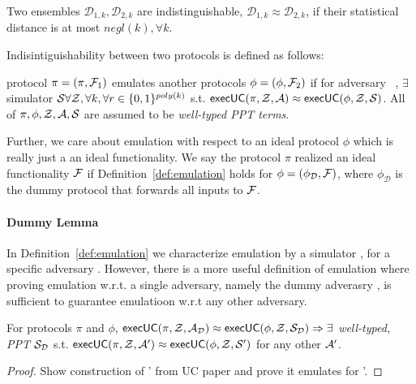 \begin{definition}[Indisinguishability]\label{def:distance}
Two ensembles $\mathcal{D}_{1,k}, \mathcal{D}_{2,k}$ are indistinguishable, $\mathcal{D}_{1,k} \approx \mathcal{D}_{2,k}$, if their statistical distance is at most $negl(k), \forall k$.
\end{definition}

Indisintiguishability between two protocols is defined as follows:
\begin{definition}[Emulation]\label{def:emulation}
protocol $\pi = (\pi, \mathcal{F}_1)$ emulates another protocols $\phi = (\phi, \mathcal{F}_2)$ if for adversary \Adversary~, $\exists$ simulator $\mathcal{S} \forall \mathcal{Z}, \forall k, \forall r \in \{0,1\}^{poly(k)}$ s.t. ${\mathsf {execUC}}(\pi, \mathcal{Z}, \mathcal{A}) \approx {\mathsf {execUC}}(\phi, \mathcal{Z}, \mathcal{S})$. All of $\pi, \phi, \mathcal{Z}, \mathcal{A}, \mathcal{S}$ are assumed to be \textit{well-typed PPT terms}.
\end{definition}

Further, we care about emulation with respect to an ideal protocol $\phi$ which is really just a an ideal functionality. 
We say the protocol $\pi$ realized an ideal functionality $\mathcal{F}$ if Definition~\ref{def:emulation} holds for $\phi = (\phi_{\mathcal{D}}, \mathcal{F})$, where $\phi_{\mathcal{D}}$ is the dummy protocol that forwards all inputs to $\mathcal{F}$.

\paragraph{Dummy Lemma}
In Definition~\ref{def:emulation} we characterize emulation by a simulator \Simulator, for a specific adversary \Adversary.
However, there is a more useful definition of emulation where proving emulation w.r.t. a single adversary, namely the dummy adverasry \DummyAdv, is sufficient to guarantee emulatioon w.r.t any other adversary.

\begin{theorem}\label{thm:dummy}
For protocols $\pi$ and $\phi$, ${\mathsf {execUC}}(\pi, \mathcal{Z}, \mathcal{A}_\mathcal{D}) \approx {\mathsf {execUC}}(\phi, \mathcal{Z}, \mathcal{S}_{\mathcal{D}}) \Rightarrow \exists$ \textit{well-typed, PPT} $\mathcal{S}_{\mathcal{D}}$ s.t. ${\mathsf {execUC}}(\pi, \mathcal{Z}, \mathcal{A}') \approx {\mathsf {execUC}}(\phi, \mathcal{Z}, \mathcal{S}')$ for any other $\mathcal{A}'$.
\end{theorem}

\begin{proof}
Show construction of \Simulator' from UC paper and prove it emulates for \Adversary'.
\end{proof}


